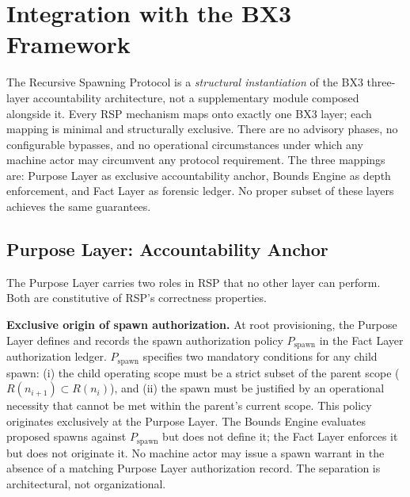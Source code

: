\section{Integration with the BX3 Framework}
\label{sec:rs-integration}

The Recursive Spawning Protocol is a \emph{structural instantiation} of the BX3 three-layer accountability architecture, not a supplementary module composed alongside it. Every RSP mechanism maps onto exactly one BX3 layer; each mapping is minimal and structurally exclusive. There are no advisory phases, no configurable bypasses, and no operational circumstances under which any machine actor may circumvent any protocol requirement. The three mappings are: Purpose Layer as exclusive accountability anchor, Bounds Engine as depth enforcement, and Fact Layer as forensic ledger. No proper subset of these layers achieves the same guarantees.

\subsection{Purpose Layer: Accountability Anchor}
\label{sec:rs-purpose-anchor}

The Purpose Layer carries two roles in RSP that no other layer can perform. Both are constitutive of RSP's correctness properties.

\medskip
\noindent\textbf{Exclusive origin of spawn authorization.} At root provisioning, the Purpose Layer defines and records the spawn authorization policy $P_{\mathrm{spawn}}$ in the Fact Layer authorization ledger. $P_{\mathrm{spawn}}$ specifies two mandatory conditions for any child spawn: (i) the child operating scope must be a strict subset of the parent scope ($R(n_{i+1}) \subset R(n_i)$), and (ii) the spawn must be justified by an operational necessity that cannot be met within the parent's current scope. This policy originates exclusively at the Purpose Layer. The Bounds Engine evaluates proposed spawns against $P_{\mathrm{spawn}}$ but does not define it; the Fact Layer enforces it but does not originate it. No machine actor may issue a spawn warrant in the absence of a matching Purpose Layer authorization record. The separation is architectural, not organizational.

